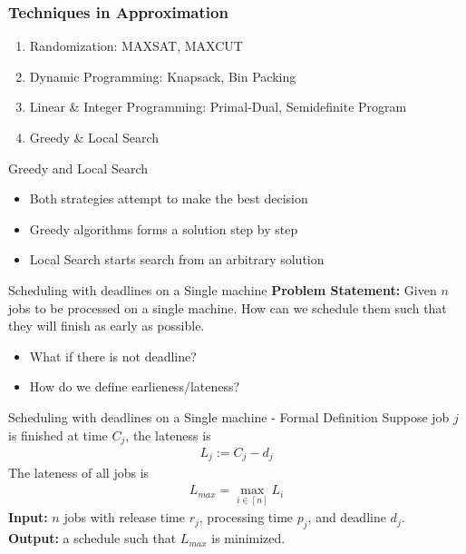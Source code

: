 \documentclass{beamer}
\newcommand*{\brk}{\\[10pt]}
\begin{document}
\begin{frame}
    \frametitle{Techniques in Approximation}
    \begin{enumerate}
        \item<1-> Randomization: MAXSAT, MAXCUT
        \item<2-> Dynamic Programming: Knapsack, Bin Packing
        \item<3-> Linear \& Integer Programming: Primal-Dual, Semidefinite Program 
        \item<4-> \color{red} Greedy \& Local Search \color{black}
    \end{enumerate}
\end{frame}

\begin{frame}{Greedy and Local Search}
    \begin{itemize}
        \item<1-> Both strategies attempt to make the best decision
        \item<2-> Greedy algorithms forms a solution step by step 
        \item<3-> Local Search starts search from an arbitrary solution
    \end{itemize}
\end{frame}


\begin{frame}{Scheduling with deadlines on a Single machine}
    \textbf{Problem Statement: } Given $n$ jobs to be processed on a single machine. 
    How can we schedule them such that they will finish as early as possible. \brk 
    \begin{itemize}
        \item What if there is not deadline?
        \item How do we define earlieness/lateness?
    \end{itemize}
\end{frame}


\begin{frame}{Scheduling with deadlines on a Single machine - Formal Definition}
Suppose job $j$ is finished at time $C_j$, the lateness is 
\begin{align*}
    L_j := C_j - d_j 
\end{align*}
The lateness of all jobs is 
\begin{align*}
    L_{max} = \max_{i \in [n]} L_i
\end{align*}
\textbf{Input:} $n$ jobs with release time $r_j$, processing time $p_j$, and deadline $d_j$. \brk 
\textbf{Output:} a schedule such that $L_{max}$ is minimized.
\end{frame}
\end{document}
